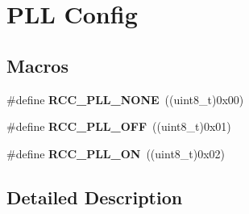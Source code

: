 \hypertarget{group___r_c_c___p_l_l___config}{}\section{P\+LL Config}
\label{group___r_c_c___p_l_l___config}
\subsection*{Macros}
\begin{DoxyCompactItemize}
\item 
\#define {\bfseries R\+C\+C\+\_\+\+P\+L\+L\+\_\+\+N\+O\+NE}~((uint8\+\_\+t)0x00)\hypertarget{group___r_c_c___p_l_l___config_gae47a612f8e15c32917ee2181362d88f3}{}\label{group___r_c_c___p_l_l___config_gae47a612f8e15c32917ee2181362d88f3}

\item 
\#define {\bfseries R\+C\+C\+\_\+\+P\+L\+L\+\_\+\+O\+FF}~((uint8\+\_\+t)0x01)\hypertarget{group___r_c_c___p_l_l___config_ga3a8d5c8bcb101c6ca1a574729acfa903}{}\label{group___r_c_c___p_l_l___config_ga3a8d5c8bcb101c6ca1a574729acfa903}

\item 
\#define {\bfseries R\+C\+C\+\_\+\+P\+L\+L\+\_\+\+ON}~((uint8\+\_\+t)0x02)\hypertarget{group___r_c_c___p_l_l___config_gaf86dbee130304ba5760818f56d34ec91}{}\label{group___r_c_c___p_l_l___config_gaf86dbee130304ba5760818f56d34ec91}

\end{DoxyCompactItemize}


\subsection{Detailed Description}

